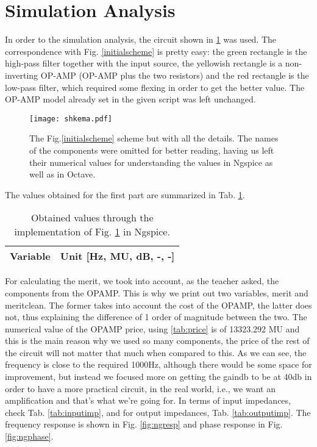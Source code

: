 \section{Simulation Analysis}

In order to the simulation analysis, the circuit shown in \ref{fig:schemescheme} was used. The correspondence with Fig. \ref{initialscheme} is pretty easy: the green rectangle is the high-pass filter together with the input source, the yellowish rectangle is a non-inverting OP-AMP (OP-AMP plus the two resistors) and the red rectangle is the low-pass filter, which required some flexing in order to get the better value. The OP-AMP model already set in the given script was left unchanged.

\begin{figure}[H]
    \centering
    \texttt{[image: shkema.pdf]}
    \caption{The Fig.\ref{initialscheme} scheme but with all the details. The names of the components were omitted for better reading, having us left their numerical values for understanding the values in Ngspice as well as in Octave.}
    \label{fig:schemescheme}
\end{figure}

The values obtained for the first part are summarized in Tab. \ref{tab:valuesng}.

\begin{table}[H]
    \centering 
    \begin{tabular}{|c|c|}
    	\hline
    	Variable & Unit [Hz, MU, dB, -, -]\\ 
    	\hline
         
    \end{tabular}
    \caption{Obtained values through the implementation of Fig. \ref{fig:schemescheme} in Ngspice.}
    \label{tab:valuesng}
\end{table}

For calculating the merit, we took into account, as the teacher asked, the components from the OPAMP. This is why we print out two variables, merit and meritclean. The former takes into account the cost of the OPAMP, the latter does not, thus explaining the difference of 1 order of magnitude between the two. The numerical value of the OPAMP price, using \ref{tab:price} is of 13323.292 MU and this is the main reason why we used so many components, the price of the rest of the circuit will not matter that much when compared to this. As we can see, the frequency is close to the required 1000Hz, although there would be some space for improvement, but instead we focused more on getting the gaindb to be at 40db in order to have a more practical circuit, in the real world, i.e., we want an amplification and that's what we're going for. In terms of input impedances, check Tab. \ref{tab:inputimp}, and for output impedances, Tab. \ref{tab:outputimp}. The frequency response is shown in Fig. \ref{fig:ngresp} and phase response in Fig. \ref{fig:ngphase}.

